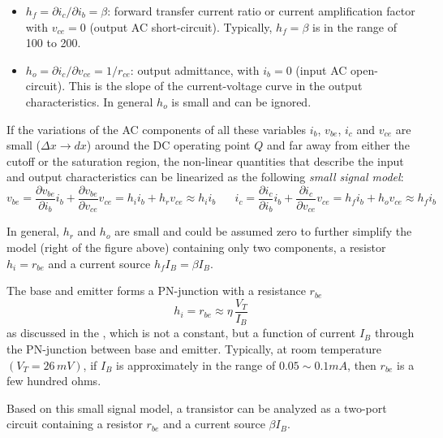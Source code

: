 \begin{itemize}
\begin{itemize}
\item $h_f=\partial i_c/\partial i_b=\beta$: forward transfer current 
    ratio or current amplification factor with $v_{ce}=0$ (output AC
    short-circuit). Typically, $h_f=\beta$ is in the range of 100 to 
    200.

\item $h_o=\partial i_c/\partial v_{ce}=1/r_{ce}$: output admittance,
  with $i_b=0$ (input AC open-circuit). This is the slope of the 
  current-voltage curve in the output characteristics. In general 
  $h_o$ is small and can be ignored.
\end{itemize}
If the variations of the AC components of all these variables 
$i_b$, $v_{be}$, $i_c$ and $v_{ce}$ are small ($\Delta x\rightarrow dx$)
around the DC operating point $Q$ and far away from either the cutoff
or the saturation region, the non-linear quantities that describe the
input and output characteristics can be linearized as the following
{\em small signal model}:
\[
v_{be}=\frac{\partial v_{be}}{\partial i_b}
i_b+\frac{\partial v_{be}}{\partial v_{ce}} v_{ce}=h_i i_b+h_r v_{ce}	
\approx h_i i_b
\;\;\;\;\;\;
i_c=\frac{\partial i_c}{\partial i_b} i_b
+\frac{\partial i_c}{\partial v_{ce}} v_{ce}=h_f i_b+h_o v_{ce}
\approx h_f i_b
\]



In general, $h_r$ and $h_o$ are small and could be assumed zero to 
further simplify the model (right of the figure above) containing
only two components, a resistor $h_i=r_{be}$ and a current source 
$h_f I_B=\beta I_B$.

The base and emitter forms a PN-junction with a resistance $r_{be}$ 
\[	
h_i=r_{be}\approx \eta\,\frac{V_T}{I_B}	
\]
as discussed in the 
, which is not a
constant, but a function of current $I_B$ through the PN-junction 
between base and emitter. Typically, at room temperature $(V_T=26\,mV)$, 
if $I_B$ is approximately in the range of $0.05\sim 0.1 mA$, then 
$r_{be}$ is a few hundred ohms. 

Based on this small signal model, a transistor can be analyzed as a 
two-port circuit containing a resistor $r_{be}$ and a current source 
$\beta I_B$.


\end{itemize}
